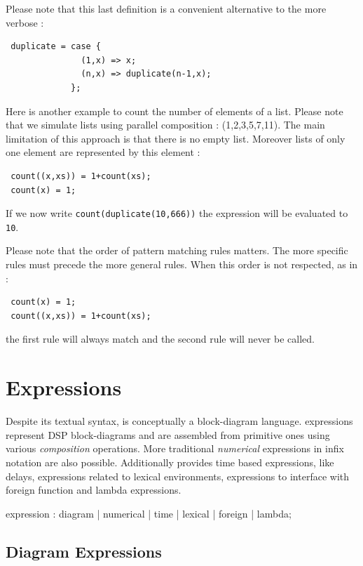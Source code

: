 \documentclass[a4paper,10pt]{book}
\begin{document}
Please note that this last definition is a convenient alternative to the more verbose :
\begin{lstlisting}
 duplicate = case { 
               (1,x) => x; 
               (n,x) => duplicate(n-1,x); 
             };
\end{lstlisting}

Here is another example to count the number of elements of a list. Please note that we simulate lists using parallel composition : (1,2,3,5,7,11). The main limitation of this approach is that there is no empty list. Moreover lists of only one element are represented by this element :
\begin{lstlisting}
 count((x,xs)) = 1+count(xs);
 count(x) = 1;
\end{lstlisting}

If we now write \lstinline'count(duplicate(10,666))' the expression will be evaluated to \lstinline'10'.

Please note that the order of pattern matching rules matters. The more specific rules must precede the more general rules. When this order is not respected, as in :
\begin{lstlisting}
 count(x) = 1;
 count((x,xs)) = 1+count(xs);
\end{lstlisting}
the first rule will always match and the second rule will never be called.



 
  
\section{Expressions}

Despite its textual syntax, \faust is conceptually a block-diagram language. \faust expressions represent DSP block-diagrams and are assembled from primitive ones using various \textit{composition} operations. More traditional \textit{numerical} expressions in infix notation are also possible. Additionally \faust provides time based expressions, like delays, expressions related to lexical environments, expressions to interface with foreign function and lambda expressions.

\begin{rail}
expression : diagram | numerical | time | lexical | foreign | lambda;
\end{rail}
  
\subsection{Diagram Expressions}
\end{document}
